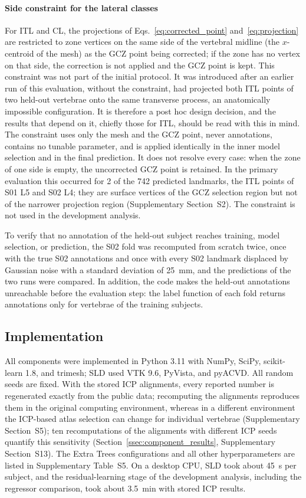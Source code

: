 \documentclass[5p,times,twocolumn,authoryear]{elsarticle}
\newif\ifhighlight
\newcommand{\rev}[1]{\ifhighlight{\color{revcolor}#1}\else#1\fi}
\begin{document}
\paragraph{Side constraint for the lateral classes} For ITL and CL, the projections of Eqs.~\eqref{eq:corrected_point} and~\eqref{eq:projection} are restricted to zone vertices on the same side of the vertebral midline (the $x$-centroid of the mesh) as the GCZ point being corrected; if the zone has no vertex on that side, the correction is not applied and the GCZ point is kept. This constraint was not part of the initial protocol. It was introduced after an earlier run of this evaluation, without the constraint, had projected both ITL points of two held-out vertebrae onto the same transverse process, an anatomically impossible configuration. It is therefore a post hoc design decision, and the results that depend on it, chiefly those for ITL, should be read with this in mind. The constraint uses only the mesh and the GCZ point, never annotations, contains no tunable parameter, and is applied identically in the inner model selection and in the final prediction. It does not resolve every case: when the zone of one side is empty, the uncorrected GCZ point is retained. \rev{In the primary evaluation this occurred for 2 of the 742 predicted landmarks, the ITL points of S01 L5 and S02 L4; they are surface vertices of the GCZ selection region but not of the narrower projection region (Supplementary Section~S2).} The constraint is not used in the development analysis.

To verify that no annotation of the held-out subject reaches training, model selection, or prediction, the S02 fold was recomputed from scratch twice, once with the true S02 annotations and once with every S02 landmark displaced by Gaussian noise with a standard deviation of 25~mm, and the predictions of the two runs were compared. \rev{In addition, the code makes the held-out annotations unreachable before the evaluation step: the label function of each fold returns annotations only for vertebrae of the training subjects.}

\subsection{Implementation}
\label{ssec:implementation}

All components were implemented in Python 3.11 with NumPy, SciPy, scikit-learn 1.8, and trimesh; SLD used VTK 9.6, PyVista, and pyACVD. All random seeds are fixed. With the stored ICP alignments, every reported number is regenerated exactly from the public data; recomputing the alignments reproduces them in the original computing environment, whereas in a different environment the ICP-based atlas selection can change for individual vertebrae (Supplementary Section~S5)\rev{; ten recomputations of the alignments with different ICP seeds quantify this sensitivity (Section~\ref{ssec:component_results}, Supplementary Section~S13)}. The Extra Trees configurations and all other hyperparameters are listed in Supplementary Table~S5. On a desktop CPU, SLD took about 45~s per subject, and the residual-learning stage of the development analysis, including the regressor comparison, took about 3.5~min with stored ICP results.
\end{document}
